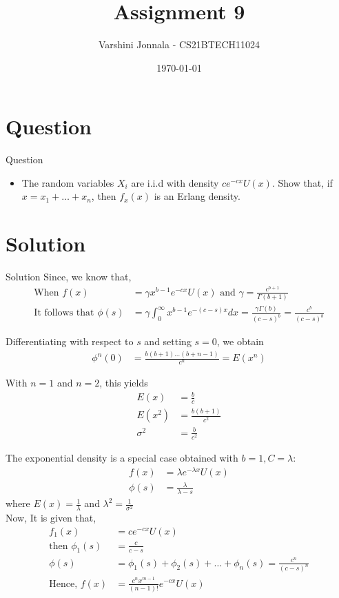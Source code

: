 \documentclass{beamer}
\title{Assignment 9}
\author{Varshini Jonnala - CS21BTECH11024}
\date{\today}
\providecommand{\brak}[1]{\ensuremath{\left(#1\right)}}
\begin{document}
\begin{frame}
    \titlepage 
\end{frame}

\section{Question}
\begin{frame}{Question}
\begin{itemize}
    \item The random variables $X_i$ are i.i.d with density $ce^{-cx} U(x)$. Show that, if $x = x_1+\dots+x_n$, then $f_x(x)$ is an Erlang density.  
\end{itemize}
\end{frame}

\section{Solution}
\begin{frame}[allowframebreaks]{Solution}
 Since, we know that,
\begin{align}
 \text{When } f(x) &= \gamma x^{b-1} e^{-cx} U(x) \text{ and } \gamma = \frac{c^{b+1}}{\Gamma (b+1)} \\
\text{It follows that } \phi (s) &= \gamma \int_{0}^{\infty} x^{b-1} e^{-(c-s)x} dx = \frac{\gamma \Gamma (b)}{\brak{c-s}^b} = \frac{c^b}{\brak{c-s}^b} 
\end{align}

Differentiating with respect to $s$ and setting $s = 0$, we obtain
\begin{align}
    \phi^{n} (0) &= \frac{b(b+1)\dots(b+n-1)}{c^n} = E\brak{x^n}
\end{align}
    
With $n = 1$ and $n = 2$, this yields 
    \begin{align}
        E\brak{x} &= \frac{b}{c} \\
        E \brak{x^2} &= \frac{b(b+1)}{c^2}\\
        \sigma^2 &= \frac{b}{c^2}
    \end{align}
    
    The exponential density is a special case obtained with $b = 1, C = \lambda$: 
    \begin{align}
        f(x) &= \lambda e^{-\lambda x} U(x) \\
        \phi (s) &= \frac{\lambda}{\lambda - s} 
    \end{align}
    where $E\brak{x} = \frac{1}{\lambda}$ and  $\lambda^2 = \frac{1}{\sigma^2}$ \\ 
Now, It is given that, 
\begin{align}
f_1(x) &= ce^{-cx} U(x) \\
\text{then } \phi_1(s) &= \frac{c}{c-s}\\
\phi(s) &= \phi_1(s) + \phi_2(s) + \dots + \phi_n(s) = \frac{c^n}{\brak{c-s}^n}\\
   \text{Hence, } f(x) &= \frac{c^n x^{m-1}}{\brak{n-1}!} e^{-cx} U(x)  
    \end{align}
\end{frame} 
\end{document}
